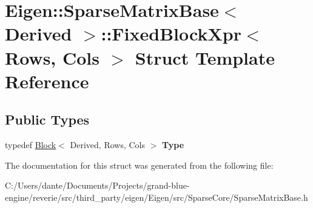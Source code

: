 \hypertarget{struct_eigen_1_1_sparse_matrix_base_1_1_fixed_block_xpr}{}\section{Eigen\+::Sparse\+Matrix\+Base$<$ Derived $>$\+::Fixed\+Block\+Xpr$<$ Rows, Cols $>$ Struct Template Reference}
\label{struct_eigen_1_1_sparse_matrix_base_1_1_fixed_block_xpr}
\subsection*{Public Types}
\begin{DoxyCompactItemize}
\item 
\mbox{\label{struct_eigen_1_1_sparse_matrix_base_1_1_fixed_block_xpr_a8350139935543855be363b2956ca4286}} 
typedef \mbox{\hyperlink{class_eigen_1_1_block}{Block}}$<$ Derived, Rows, Cols $>$ {\bfseries Type}
\end{DoxyCompactItemize}


The documentation for this struct was generated from the following file\+:\begin{DoxyCompactItemize}
\item 
C\+:/\+Users/dante/\+Documents/\+Projects/grand-\/blue-\/engine/reverie/src/third\+\_\+party/eigen/\+Eigen/src/\+Sparse\+Core/Sparse\+Matrix\+Base.\+h\end{DoxyCompactItemize}
